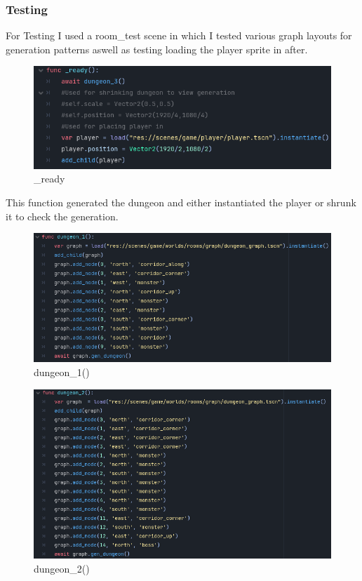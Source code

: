 \documentclass{article}
\begin{document}
        \subsubsection{Testing}
        For Testing I used a room\_test scene in which I tested various graph layouts for generation patterns aswell as testing loading the player sprite in after.\\
        \begin{figure}[H]
                \centering
                \includegraphics[width = 0.8\columnwidth]{images/development/RoomTest_ready.PNG}
                \caption{\_ready}
        \end{figure} 
        This function generated the dungeon and either instantiated the player or shrunk it to check the generation.\\
                \begin{figure}[H]
                        \centering
                        \includegraphics[width = 0.8\columnwidth]{images/development/RoomTest_dungeon_1.PNG}
                        \caption{dungeon\_1()}
                \end{figure}
                \begin{figure}[H]
                        \centering
                        \includegraphics[width = 0.8\columnwidth]{images/development/RoomTest_dungeon_2.PNG}
                        \caption{dungeon\_2()}
                \end{figure}
\end{document}
